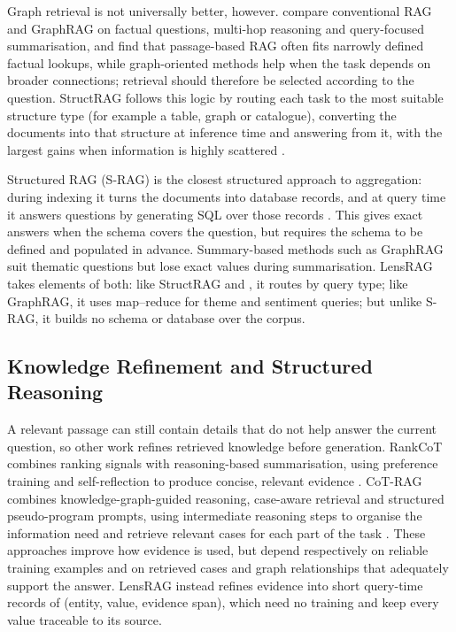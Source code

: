 \documentclass[11pt,letterpaper,oneside]{report}
\begin{document}
Graph retrieval is not universally better, however. \citet{han2026ragvsgraphrag}
compare conventional RAG and GraphRAG on factual questions, multi-hop
reasoning and query-focused summarisation, and find that passage-based RAG
often fits narrowly defined factual lookups, while graph-oriented methods help
when the task depends on broader connections; retrieval should therefore be
selected according to the question. StructRAG follows this logic by routing
each task to the most suitable structure type (for example a table, graph or
catalogue), converting the documents into that structure at inference time
and answering from it, with the largest gains when information is highly
scattered \citep{li2025structrag}.

Structured RAG (S-RAG) is the closest structured approach to aggregation: during
indexing it turns the documents into database records, and at query time it
answers questions by generating SQL over those records
\citep{koshorek2025srag}.
This gives exact answers when the schema covers the question, but requires
the schema to be defined and populated in advance. Summary-based methods such
as GraphRAG suit thematic questions but lose exact values during
summarisation. LensRAG takes elements of both: like StructRAG and
\citet{han2026ragvsgraphrag}, it routes by query type; like GraphRAG, it uses
map--reduce for theme and sentiment queries; but unlike S-RAG, it builds no
schema or database over the corpus.

\subsection{Knowledge Refinement and Structured Reasoning}
A relevant passage can still contain details that do not help answer the
current question, so other work refines retrieved knowledge before
generation. RankCoT combines ranking signals with reasoning-based
summarisation, using preference training and self-reflection to produce
concise, relevant evidence \citep{wu2025rankcot}. CoT-RAG combines
knowledge-graph-guided reasoning, case-aware retrieval and structured
pseudo-program prompts, using intermediate reasoning steps to organise the
information need and retrieve relevant cases for each part of the task
\citep{li2025cotrag}. These approaches improve how evidence is used, but
depend respectively on reliable training examples and on retrieved cases and
graph relationships that adequately support the answer. LensRAG instead
refines evidence into short query-time records of (entity, value, evidence
span), which need no training and keep every value traceable to its source.
\end{document}
